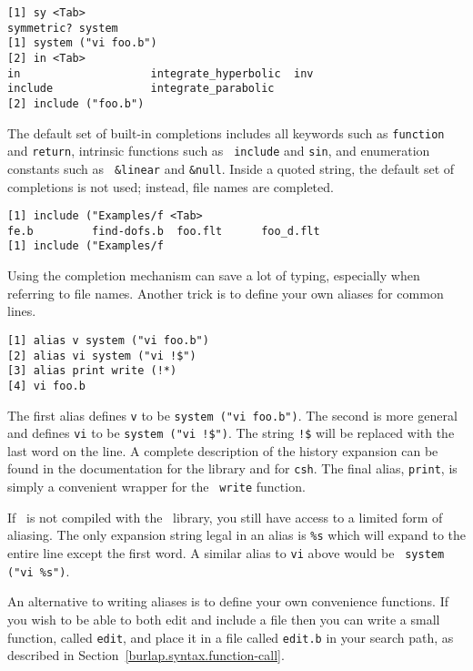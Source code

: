\begin{screen}
\begin{verbatim}
[1] sy <Tab>
symmetric? system
[1] system ("vi foo.b")
[2] in <Tab>
in                    integrate_hyperbolic  inv
include               integrate_parabolic   
[2] include ("foo.b")
\end{verbatim}
\end{screen}

The default set of built-in completions includes all keywords such as
{\tt function} and {\tt return}, intrinsic functions such as {\tt
include} and {\tt sin}, and enumeration constants such as {\tt
\&linear} and {\tt \&null}.  Inside a quoted string, the default set
of completions is not used; instead, file names are completed.

\begin{screen}
\begin{verbatim}
[1] include ("Examples/f <Tab>
fe.b         find-dofs.b  foo.flt      foo_d.flt    
[1] include ("Examples/f
\end{verbatim}
\end{screen}

Using the completion mechanism can save a lot of typing, especially
when referring to file names.  Another trick is to define your own
aliases for common lines.

\begin{screen}
\begin{verbatim}
[1] alias v system ("vi foo.b")
[2] alias vi system ("vi !$")
[3] alias print write (!*)
[4] vi foo.b
\end{verbatim}
\end{screen}

The first alias defines {\tt v} to be {\tt system ("vi foo.b")}.  The
second is more general and defines {\tt vi} to be {\tt system ("vi
!\$")}.  The string {\tt !\$} will be replaced with the last word on
the line.  A complete description of the history expansion can be
found in the documentation for the \rl library and for {\tt csh}.  The
final alias, {\tt print}, is simply a convenient wrapper for the {\tt
write} function.

If \burlap\ is not compiled with the \rl\ library, you still have
access to a limited form of aliasing.  The only expansion string legal
in an alias is {\tt \%s} which will expand to the entire line except
the first word.  A similar alias to {\tt vi} above would be {\tt
system ("vi \%s")}.

An alternative to writing aliases is to define your own convenience
functions.  If you wish to be able to both edit and include a file
then you can write a small function, called {\tt edit}, and place it
in a file called {\tt edit.b} in your search path, as described in
Section~\ref{burlap.syntax.function-call}.

